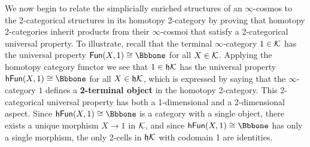 
  We now begin to relate the simplicially enriched structures of an $\infty$-cosmos to the 2-cat\-e\-go\-ri\-cal structures in its homotopy 2-category by proving that homotopy 2-categories inherit products from their $\infty$-cosmoi that satisfy a 2-cat\-e\-go\-ri\-cal universal property. To illustrate, recall that the terminal $\infty$-category $1 \in {\mathord{\mathcal{K}}}$ has the universal property $\Fun(X,1) \cong \catone$ for all $X \in {\mathord{\mathcal{K}}}$. Applying the homotopy category functor we see that $1 \in \mathfrak{h}{\mathord{\mathcal{K}}}$ has the universal property $\hFun(X,1) \cong \catone$ for all $X \in \mathfrak{h}{\mathord{\mathcal{K}}}$, which is expressed by saying that the $\infty$-category $1$ defines a \textbf{2-terminal object} in the homotopy 2-category. This 2-categorical universal property has both a 1-dimensional and a 2-dimensional aspect. Since $\hFun(X,1)\cong \catone$ is a category with a single object, there exists a unique morphism $X \to 1$ in ${\mathord{\mathcal{K}}}$, and since $\hFun(X,1)\cong\catone$ has only a single morphism,  the only 2-cells in $\mathfrak{h}{\mathord{\mathcal{K}}}$ with codomain 1 are identities.

